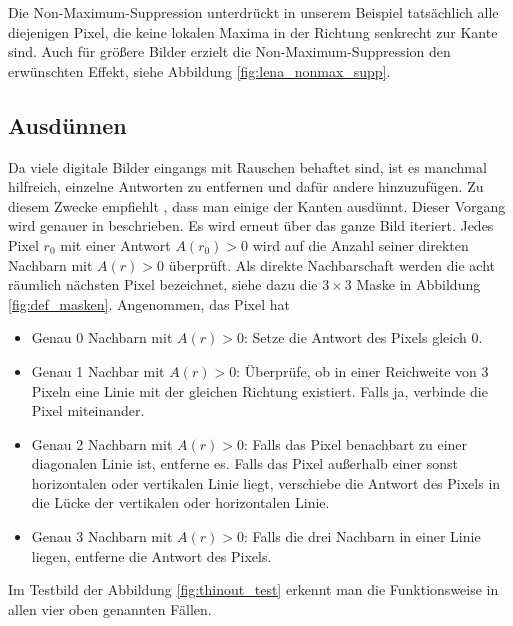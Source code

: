 \documentclass[a4paper, 11pt]{report}
\theoremstyle{definition}
\begin{document}
			Die Non-Maximum-Suppression unterdrückt in unserem Beispiel tatsächlich alle diejenigen Pixel, die keine lokalen Maxima in der Richtung senkrecht zur Kante sind. Auch für größere Bilder erzielt die Non-Maximum-Suppression den erwünschten Effekt, siehe Abbildung \ref{fig:lena_nonmax_supp}.


		\subsection{Ausdünnen}\label{ssec:thinout}
			Da viele digitale Bilder eingangs mit Rauschen behaftet sind, ist es manchmal hilfreich, einzelne Antworten zu entfernen und dafür andere hinzuzufügen. Zu diesem Zwecke empfiehlt \cite{SUSAN}, dass man einige der Kanten ausdünnt. Dieser Vorgang wird genauer in \cite{thinout} beschrieben.
			Es wird erneut über das ganze Bild iteriert. Jedes Pixel $r_0$ mit einer Antwort $A(r_0) > 0$ wird auf die Anzahl seiner direkten Nachbarn mit $A(r) > 0$ überprüft. Als direkte Nachbarschaft werden die acht räumlich nächsten Pixel bezeichnet, siehe dazu die $3\times 3$ Maske in Abbildung \ref{fig:def_masken}. Angenommen, das Pixel hat
			\begin{itemize}
				\item Genau 0 Nachbarn mit $A(r) > 0$:
					Setze die Antwort des Pixels gleich 0.
				\item Genau 1 Nachbar mit $A(r) > 0$:
					Überprüfe, ob in einer Reichweite von 3 Pixeln eine Linie mit der gleichen Richtung existiert. Falls ja, verbinde die Pixel miteinander.
				\item Genau 2 Nachbarn mit $A(r) > 0$:
					Falls das Pixel benachbart zu einer diagonalen Linie ist, entferne es.
					Falls das Pixel außerhalb einer sonst horizontalen oder vertikalen Linie liegt, verschiebe die Antwort des Pixels in die Lücke der vertikalen oder horizontalen Linie.
				\item Genau 3 Nachbarn mit $A(r) > 0$:
					Falls die drei Nachbarn in einer Linie liegen, entferne die Antwort des Pixels.
			\end{itemize}

			Im Testbild der Abbildung \ref{fig:thinout_test} erkennt man die Funktionsweise in allen vier oben genannten Fällen.
\end{document}
